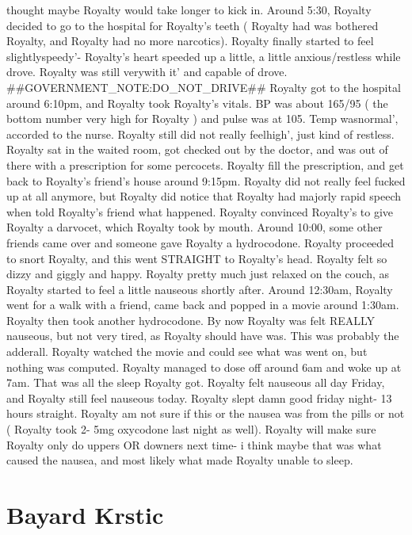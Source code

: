 \documentclass[12pt]{book}
\begin{document}
thought maybe Royalty would take longer to kick in. Around 5:30, Royalty decided to go to the hospital for Royalty's teeth ( Royalty had was bothered Royalty, and Royalty had no more narcotics). Royalty finally started to feel slightlyspeedy'- Royalty's heart speeded up a little, a little anxious/restless while drove. Royalty was still verywith it' and capable of drove. \#\#GOVERNMENT\_NOTE:DO\_NOT\_DRIVE\#\# Royalty got to the hospital around 6:10pm, and Royalty took Royalty's vitals. BP was about 165/95 ( the bottom number very high for Royalty ) and pulse was at 105. Temp wasnormal', accorded to the nurse. Royalty still did not really feelhigh', just kind of restless. Royalty sat in the waited room, got checked out by the doctor, and was out of there with a prescription for some percocets. Royalty fill the prescription, and get back to Royalty's friend's house around 9:15pm. Royalty did not really feel fucked up at all anymore, but Royalty did notice that Royalty had majorly rapid speech when told Royalty's friend what happened. Royalty convinced Royalty's to give Royalty a darvocet, which Royalty took by mouth. Around 10:00, some other friends came over and someone gave Royalty a hydrocodone. Royalty proceeded to snort Royalty, and this went STRAIGHT to Royalty's head. Royalty felt so dizzy and giggly and happy. Royalty pretty much just relaxed on the couch, as Royalty started to feel a little nauseous shortly after. Around 12:30am, Royalty went for a walk with a friend, came back and popped in a movie around 1:30am. Royalty then took another hydrocodone. By now Royalty was felt REALLY nauseous, but not very tired, as Royalty should have was. This was probably the adderall. Royalty watched the movie and could see what was went on, but nothing was computed. Royalty managed to dose off around 6am and woke up at 7am. That was all the sleep Royalty got. Royalty felt nauseous all day Friday, and Royalty still feel nauseous today. Royalty slept damn good friday night- 13 hours straight. Royalty am not sure if this or the nausea was from the pills or not ( Royalty took 2- 5mg oxycodone last night as well). Royalty will make sure Royalty only do uppers OR downers next time- i think maybe that was what caused the nausea, and most likely what made Royalty unable to sleep.



\chapter{Bayard Krstic}
\end{document}
